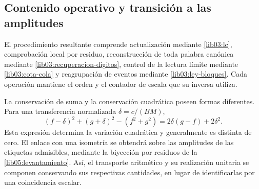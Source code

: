\subsection{Contenido operativo y transición a las amplitudes}
\label{lib03:operativo}

El procedimiento resultante comprende actualización mediante
\eqref{lib03:lc}, comprobación local por residuo, reconstrucción de
toda palabra canónica mediante \eqref{lib03:recuperacion-digitos},
control de la lectura límite mediante \eqref{lib03:cota-cola} y
reagrupación de eventos mediante \eqref{lib03:ley-bloques}. Cada
operación mantiene el orden y el contador de escala que su inversa
utiliza.

La conservación de suma y la conservación cuadrática poseen formas
diferentes. Para una transferencia normalizada
\(\delta=c/(BM)\),
\begin{equation}
 (f-\delta)^2+(g+\delta)^2-(f^2+g^2)
 =2\delta(g-f)+2\delta^2.
 \label{lib03:variacion-cuadratica}
\end{equation}
Esta expresión determina la variación cuadrática y generalmente es
distinta de cero. El enlace con una isometría se obtendrá sobre las
amplitudes de las etiquetas admisibles, mediante la biyección por
residuos de la \cref{lib05:levantamiento}. Así, el transporte aritmético
y su realización unitaria se componen conservando sus respectivas
cantidades, en lugar de identificarlas por una coincidencia escalar.

